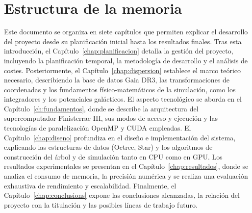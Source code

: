 \section{Estructura de la memoria}\label{sec:estructura-de-la-memoria}
Este documento se organiza en siete capítulos que permiten explicar el desarrollo del proyecto desde su planificación inicial hasta los resultados finales.
Tras esta introducción, el Capítulo~\ref{chap:planificacion} detalla la gestión del proyecto, incluyendo la planificación temporal, la metodología de desarrollo y el análisis de costes.
Posteriormente, el Capítulo~\ref{chap:dispersion} establece el marco teórico necesario, describiendo la base de datos Gaia DR3, las transformaciones de coordenadas y los fundamentos físico-matemáticos de la simulación, como los integradores y los potenciales galácticos.
El aspecto tecnológico se aborda en el Capítulo~\ref{ch:fundamentos}, donde se describe la arquitectura del supercomputador Finisterrae III, sus modos de acceso y ejecución y las tecnologías de paralelización OpenMP y CUDA empleadas.
El Capítulo~\ref{chap:diseno} profundiza en el diseño e implementación del sistema, explicando las estructuras de datos (Octree, Star) y los algoritmos de construcción del árbol y de simulación tanto en CPU como en GPU.
Los resultados experimentales se presentan en el Capítulo~\ref{chap:resultados}, donde se analiza el consumo de memoria, la precisión numérica y se realiza una evaluación exhaustiva de rendimiento y escalabilidad.
Finalmente, el Capítulo~\ref{chap:conclusions} expone las conclusiones alcanzadas, la relación del proyecto con la titulación y las posibles líneas de trabajo futuro.


